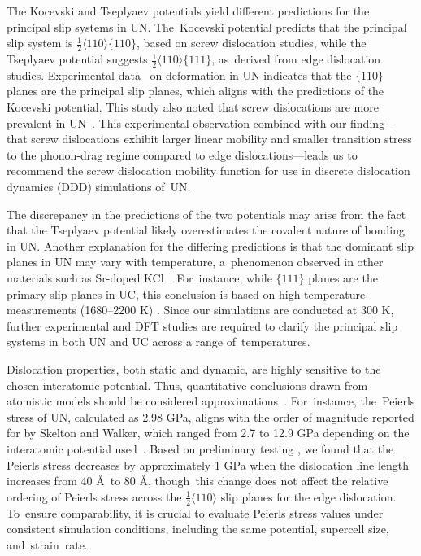 \documentclass[applsci,article,accept,pdftex,moreauthors]{Definitions/mdpi}
\newcommand{\?}{\stackrel{?}{=}}
\begin{document}
The Kocevski and Tseplyaev potentials yield different predictions for the principal slip systems in UN. The~Kocevski potential predicts that the principal slip system is $\frac{1}{2} \langle 110 \rangle \{110\}$, based on screw dislocation studies, while the Tseplyaev potential suggests $\frac{1}{2} \langle 110 \rangle \{111\}$, as~derived from edge dislocation studies. Experimental data~\cite{Sole1968} on deformation in UN indicates that the $\{110\}$ planes are the principal slip planes, which aligns with the predictions of the Kocevski potential. This study also noted that screw dislocations are more prevalent in UN~\cite{Sole1968}. This experimental observation combined with our finding---that screw dislocations exhibit larger linear mobility and smaller transition stress to the phonon-drag regime compared to edge dislocations---leads us to recommend the screw dislocation mobility function for use in discrete dislocation dynamics (DDD) simulations of~UN.

The discrepancy in the predictions of the two potentials may arise from the fact that the Tseplyaev potential likely overestimates the covalent nature of bonding in UN. Another explanation for the differing predictions is that the dominant slip planes in UN may vary with temperature, a~phenomenon observed in other materials such as Sr-doped KCl~\cite{Haasen1985}. For~instance, while $\{111\}$ planes are the primary slip planes in UC, this conclusion is based on high-temperature measurements (1680--2200 K) \cite{Vasudevamurthy2022}. Since our simulations are conducted at 300 K, further experimental and DFT studies are required to clarify the principal slip systems in both UN and UC across a range of~temperatures.

Dislocation properties, both static and dynamic, are highly sensitive to the chosen interatomic potential. Thus, quantitative conclusions drawn from atomistic models should be considered approximations~\cite{Puls1976, Liu2012}. For~instance, the~Peierls stress of UN, calculated as 2.98 GPa, aligns with the order of magnitude reported for  by Skelton and Walker, which ranged from 2.7 to 12.9 GPa depending on the interatomic potential used~\cite{Skelton2017}. Based on preliminary testing %
, we found that the Peierls stress decreases by approximately 1 GPa when the dislocation line length increases from 40 \AA\ to 80 \AA, though~this change does not affect the relative ordering of Peierls stress across the $\frac{1}{2}\langle110\rangle$ slip planes for the edge dislocation. To~ensure comparability, it is crucial to evaluate Peierls stress values under consistent simulation conditions, including the same potential, supercell size, and~strain~rate.
\end{document}
